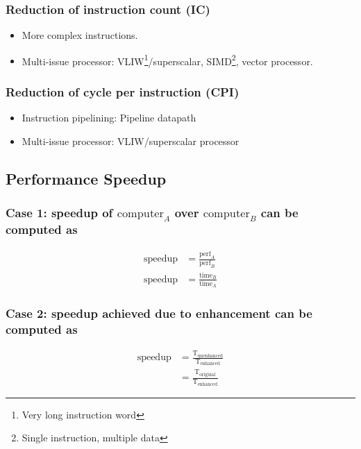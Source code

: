 \documentclass[11pt]{article}
\begin{document}
\subsubsection{Reduction of instruction count (IC)}
    \begin{itemize}
        \item More complex instructions.
        \item Multi-issue processor: VLIW\footnote{Very long instruction word}/superscalar, SIMD\footnote{Single instruction, multiple data}, vector processor.
    \end{itemize}

\subsubsection{Reduction of cycle per instruction (CPI)}
    \begin{itemize}
        \item Instruction pipelining: Pipeline datapath
        \item Multi-issue processor: VLIW/superscalar processor
    \end{itemize}

\subsection{Performance Speedup}

\subsubsection{Case 1: speedup of \(\text{computer}_A\) over \(\text{computer}_B\) can be computed as}
    \begin{align}
        \text{speedup} &= \frac{\text{perf}_A}{\text{perf}_B}\\[1em]
        \text{speedup} &= \frac{\text{time}_B}{\text{time}_A}
    \end{align}

\subsubsection{Case 2: speedup achieved due to enhancement can be computed as}
    \begin{align}
        \text{speedup} &= \frac{\text{T}_{\text{unenhanced}}}{\text{T}_{\text{enhanced}}}\\[1em]
        &= \frac{\text{T}_{\text{original}}}{\text{T}_{\text{enhanced}}}
    \end{align}
\end{document}
